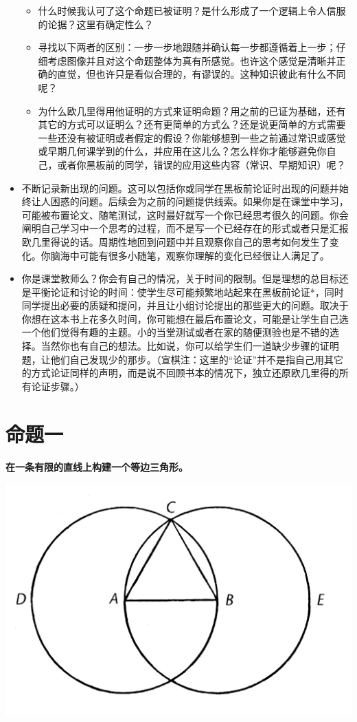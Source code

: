 \documentclass[
]{book}
\begin{document}
\begin{itemize}
  \begin{itemize}
  \item
    什么时候我认可了这个命题已被证明？是什么形成了一个逻辑上令人信服的论据？这里有确定性么？
  \item
    寻找以下两者的区别：一步一步地跟随并确认每一步都遵循着上一步；仔细考虑图像并且对这个命题整体为真有所感觉。也许这个感觉是清晰并正确的直觉，但也许只是看似合理的，有谬误的。这种知识彼此有什么不同呢？
  \item
    为什么欧几里得用他证明的方式来证明命题？用之前的已证为基础，还有其它的方式可以证明么？还有更简单的方式么？还是说更简单的方式需要一些还没有被证明或者假定的假设？你能够想到一些之前通过常识或感觉或早期几何课学到的什么，并应用在这儿么？怎么样你才能够避免你自己，或者你黑板前的同学，错误的应用这些内容（常识、早期知识）呢？
  \end{itemize}
\item
  不断记录新出现的问题。这可以包括你或同学在黑板前论证时出现的问题并始终让人困惑的问题。后续会为之前的问题提供线索。如果你是在课堂中学习，可能被布置论文、随笔测试，这时最好就写一个你已经思考很久的问题。你会阐明自己学习中一个思考的过程，而不是写一个已经存在的形式或者只是汇报欧几里得说的话。周期性地回到问题中并且观察你自己的思考如何发生了变化。你脑海中可能有很多小随笔，观察你理解的变化已经很让人满足了。
\item
  你是课堂教师么？你会有自己的情况，关于时间的限制。但是理想的总目标还是平衡论证和讨论的时间：使学生尽可能频繁地站起来在黑板前论证*，同时同学提出必要的质疑和提问，并且让小组讨论提出的那些更大的问题。取决于你想在这本书上花多久时间，你可能想在最后布置论文，可能是让学生自己选一个他们觉得有趣的主题。小的当堂测试或者在家的随便测验也是不错的选择。当然你也有自己的想法。比如说，你可以给学生们一道缺少步骤的证明题，让他们自己发现少的那步。（宣棋注：这里的``论证''并不是指自己用其它的方式论证同样的声明，而是说不回顾书本的情况下，独立还原欧几里得的所有论证步骤。）
\end{itemize}

\hypertarget{ux547dux9898ux4e00}{%
\section{命题一}\label{ux547dux9898ux4e00}}

\textbf{在一条有限的直线上构建一个等边三角形。}

\includegraphics[width=0.4\linewidth]{./image/0}
\end{document}

